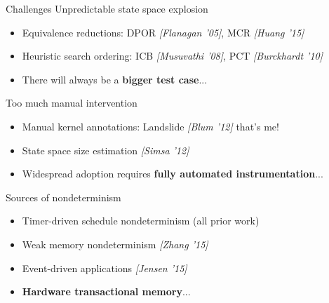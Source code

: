 \documentclass[xcolor=dvipsnames]{beamer}
\begin{document}
\begin{frame}{Challenges} %
	Unpredictable state space explosion
	\begin{itemize}
		\item Equivalence reductions: DPOR {\em [Flanagan '05]}, MCR {\em [Huang '15]}
		\item Heuristic search ordering: ICB {\em [Musuvathi '08]}, PCT {\em [Burckhardt '10]}
		\item There will always be a {\bf bigger test case}...
	\end{itemize}
	\pause
	\linegap

	Too much manual intervention %
	\begin{itemize}
		\item Manual kernel annotations: Landslide {\em [Blum '12]} {\tiny that's me!}
		\item State space size estimation {\em [Simsa '12]}
		\item Widespread adoption requires {\bf fully automated instrumentation}...
	\end{itemize}
	\pause
	\linegap

	Sources of nondeterminism
	\begin{itemize}
		\item Timer-driven schedule nondeterminism (all prior work)
		\item Weak memory nondeterminism {\em [Zhang '15]}
		\item Event-driven applications {\em [Jensen '15]}
		\item {\bf Hardware transactional memory}...
	\end{itemize}
\end{frame}

\end{document}
